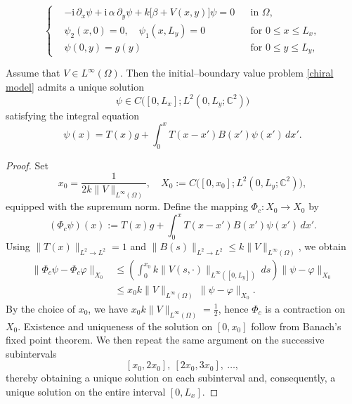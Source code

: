 \documentclass[10pt,a4paper]{amsart}
\begin{document}
\begin{equation}\label{chiral model}
\left\{
\begin{aligned}
  &-\mathrm{i}\,\partial_x \psi + \mathrm{i}\,\alpha\,\partial_y \psi + k\bigl[\beta + V(x,y)\bigr]\psi = 0
  && \text{in } \Omega,\\[0.4em]
  &\psi_2(x,0)=0,\quad \psi_1(x,L_y)=0
  && \text{for } 0\le x\le L_x,\\[0.4em]
  &\psi(0,y)=g(y)
  && \text{for } 0\le y\le L_y,
\end{aligned}
\right.
\end{equation}

\begin{thm}
Assume that $V\in L^{\infty}(\Omega)$. Then the initial--boundary value problem \eqref{chiral model} admits a unique solution
\[
\psi\in C\bigl([0,L_x];L^2(0,L_y;\mathbb{C}^2)\bigr)
\]
satisfying the integral equation
\begin{equation}\label{iter of chiral}
    \psi(x)
    = T(x)g
    + \int_0^x T(x-x')B(x')\psi(x')\,dx'.
\end{equation}
\end{thm}

\begin{proof}
Set
\[
x_0=\frac{1}{2k\|V\|_{L^{\infty}(\Omega)}},
\quad
X_0:=C\bigl([0,x_0];L^2(0,L_y;\mathbb{C}^2)\bigr),
\]
equipped with the supremum norm. Define the mapping $\Phi_c:X_0\to X_0$ by
\[
(\Phi_c\psi)(x)
:=
T(x)g
+
\int_0^x T(x-x')B(x')\psi(x')\,dx'.
\]
Using $\|T(x)\|_{L^2\to L^2}=1$ and $\|B(s)\|_{L^2\to L^2}\le k\|V\|_{L^\infty(\Omega)}$, we obtain
\begin{align*}
    \|\Phi_c\psi-\Phi_c\varphi\|_{X_0}
&\leq
\left(\int_0^{x_0}k\|V(s,\cdot)\|_{L^\infty([0,L_y])}\,ds\right)\|\psi-\varphi\|_{X_0}\\
&\leq
 x_0 k\|V\|_{L^\infty(\Omega)}\,\|\psi-\varphi\|_{X_0}.
\end{align*}
By the choice of $x_0$,  we have $ x_0k\|V\|_{L^\infty(\Omega)}=\tfrac12$, hence $\Phi_c$ is a contraction on $X_0$. Existence and uniqueness of the solution on $[0,x_0]$ follow from Banach's fixed point theorem. We then repeat the same argument on the successive subintervals
\[
[x_0,2x_0],\ [2x_0,3x_0],\ \ldots,
\]
thereby obtaining a unique solution on each subinterval and, consequently, a unique solution on the entire interval $[0,L_x]$. 
\end{proof}
\end{document}
